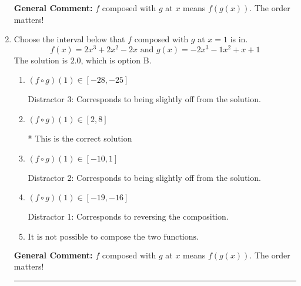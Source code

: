 \documentclass{extbook}[14pt]
\newcommand{\litem}[1]{\item #1

\rule{\textwidth}{0.4pt}}
\begin{document}
\begin{enumerate}
{\begin{enumerate}[label=\Alph*.]
\end{enumerate}

\textbf{General Comment:} $f$ composed with $g$ at $x$ means $f(g(x))$. The order matters!
}
\litem{
Choose the interval below that $f$ composed with $g$ at $x=1$ is in.
\[ f(x) = 2x^{3} +2 x^{2} -2 x \text{ and } g(x) = -2x^{3} -1 x^{2} +x + 1 \]The solution is \( 2.0 \), which is option B.\begin{enumerate}[label=\Alph*.]
\item \( (f \circ g)(1) \in [-28, -25] \)

 Distractor 3: Corresponds to being slightly off from the solution.
\item \( (f \circ g)(1) \in [2, 8] \)

* This is the correct solution
\item \( (f \circ g)(1) \in [-10, 1] \)

 Distractor 2: Corresponds to being slightly off from the solution.
\item \( (f \circ g)(1) \in [-19, -16] \)

 Distractor 1: Corresponds to reversing the composition.
\item \( \text{It is not possible to compose the two functions.} \)


\end{enumerate}

\textbf{General Comment:} $f$ composed with $g$ at $x$ means $f(g(x))$. The order matters!
}
\end{enumerate}
\end{document}
